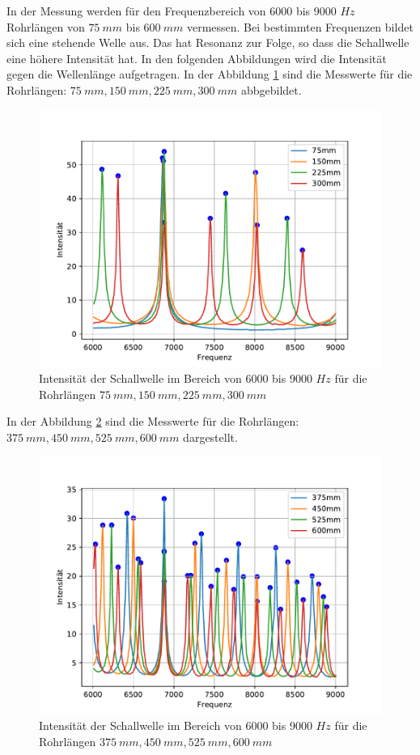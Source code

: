 In der Messung werden für den Frequenzbereich von 6000 bis 9000 $\si{Hz}$ Rohrlängen von $\SI{75}{mm}$ bis $\SI{600}{mm}$ vermessen.
Bei bestimmten Frequenzen bildet sich eine stehende Welle aus. Das hat Resonanz zur Folge, so dass die Schallwelle eine höhere Intensität hat.
In den folgenden Abbildungen wird die Intensität gegen die Wellenlänge aufgetragen.
In der Abbildung \ref{fig.1} sind die Messwerte für die Rohrlängen: $\SI{75}{mm}, \SI{150}{mm}, \SI{225}{mm}, \SI{300}{mm}$ abbgebildet.
\begin{figure}[h!]
  \centering
  \includegraphics[width=\textwidth]{1234.pdf}
  \caption{Intensität der Schallwelle im Bereich von 6000 bis 9000 $\si{Hz}$ für die Rohrlängen $\SI{75}{mm}, \SI{150}{mm}, \SI{225}{mm}, \SI{300}{mm}$}
  \label{fig.1}
\end{figure}
In der Abbildung \ref{fig.2} sind die Messwerte für die Rohrlängen: $\SI{375}{mm}, \SI{450}{mm}, \SI{525}{mm}, \SI{600}{mm}$ dargestellt.
\begin{figure}[h!]
  \centering
  \includegraphics[width=\textwidth]{5678.pdf}
  \caption{Intensität der Schallwelle im Bereich von 6000 bis 9000 $\si{Hz}$ für die Rohrlängen $\SI{375}{mm}, \SI{450}{mm}, \SI{525}{mm}, \SI{600}{mm}$}
  \label{fig.2}
\end{figure}
